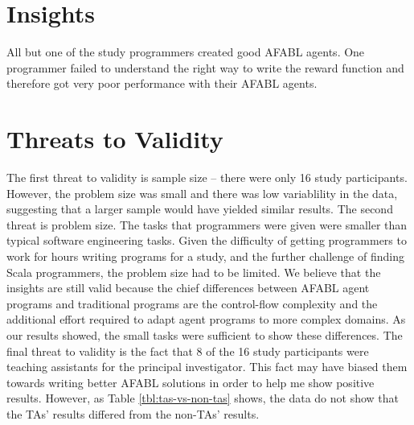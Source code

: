 \section{Insights}

All but one of the study programmers created good AFABL agents. One programmer failed to understand the right way to write the reward function and therefore got very poor performance with their AFABL agents.



\section{Threats to Validity}

The first threat to validity is sample size -- there were only 16 study participants. However, the problem size was small and there was low variablility in the data, suggesting that a larger sample would have yielded similar results. The second threat is problem size. The tasks that programmers were given were smaller than typical software engineering tasks. Given the difficulty of getting programmers to work for hours writing programs for a study, and the further challenge of finding Scala programmers, the problem size had to be limited. We believe that the insights are still valid because the chief differences between AFABL agent programs and traditional programs are the control-flow complexity and the additional effort required to adapt agent programs to more complex domains. As our results showed, the small tasks were sufficient to show these differences. The final threat to validity is the fact that 8 of the 16 study participants were teaching assistants for the principal investigator. This fact may have biased them towards writing better AFABL solutions in order to help me show positive results. However, as Table \ref{tbl:tas-vs-non-tas} shows, the data do not show that the TAs' results differed from the non-TAs' results.

